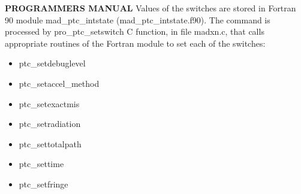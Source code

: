 {\bf PROGRAMMERS MANUAL}   
Values of the switches are stored in Fortran 90 module
mad\_ptc\_intstate (mad\_ptc\_intstate.f90). The command is processed by
pro\_ptc\_setswitch C function, in file madxn.c, that calls appropriate
routines of the Fortran module to set each of the switches:   
\begin{itemize}
   \item  ptc\_setdebuglevel 
   \item  ptc\_setaccel\_method 
   \item  ptc\_setexactmis 
   \item  ptc\_setradiation 
   \item  ptc\_settotalpath 
   \item  ptc\_settime 
   \item  ptc\_setfringe  
\end{itemize}

